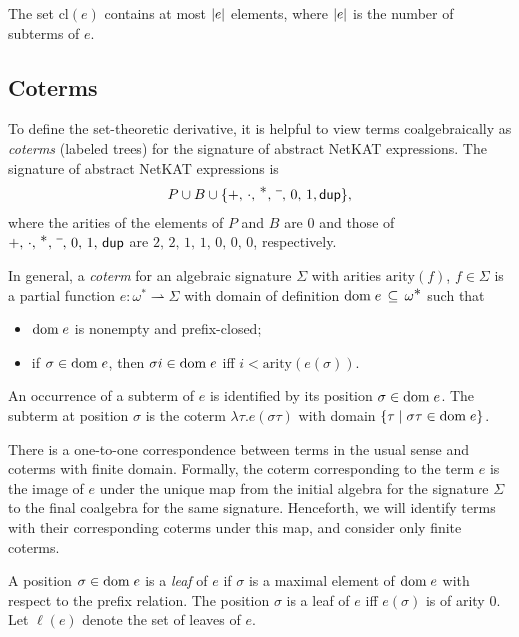 \documentclass{article}
\newcommand\pdup{\mathop{\mathsf{dup}}}
\renewcommand\star{^{\textstyle *}}
\newcommand\clname{\mathrm{cl}}
\newcommand\cl[1]{\clname(#1)}
\newcommand\pfun\rightharpoonup
\newcommand\arity[1]{\mathrm{arity}(#1)}
\begin{document}
\begin{lemma}
\label{eq:derivlinear}
The set $\cl e$ contains at most $|e|$ elements, where $|e|$ is the
number of subterms of $e$.
\end{lemma}
%
\subsection*{Coterms}

To define the set-theoretic derivative, it is helpful to view terms coalgebraically as \emph{coterms} (labeled trees) for the signature of abstract NetKAT expressions. The signature of abstract NetKAT expressions is
\begin{align*}
P\cup B\cup\{+,\,\cdot,\,\star,\,\barnone,\,0,\,1,\pdup\},
\end{align*}
where the arities of the elements of $P$ and $B$ are $0$ and those of $+,\,\cdot,\,\star,\,\barnone,\,0,\,1,\,\pdup$ are $2,\,2,\,1,\,1,\,0,\,0,\,0$, respectively.

In general, a \emph{coterm} for an algebraic signature $\Sigma$ with arities $\arity f$, $f\in\Sigma$ is a partial function $e:\omega\star\pfun\Sigma$ with domain of definition $\dom e\subs\omega\star$ such that
\begin{itemize}
\item 
${\rm dom\;}e$ is nonempty and prefix-closed;
\item
if $\sigma\in{\rm dom\;}e$, then $\sigma i\in{\rm dom\;}e$ iff $i < \arity{e(\sigma)}$.
\end{itemize}
An occurrence of a subterm of $e$ is identified by its position $\sigma\in{\rm dom\;}e$.  The subterm at position $\sigma$ is the coterm $\lambda\tau.e(\sigma\tau)$ with domain $\{\tau \mid \sigma\tau\in{\rm dom\;}e\}$.

There is a one-to-one correspondence between terms in the usual sense and coterms with finite domain. Formally, the coterm corresponding to the term $e$ is the image of $e$ under the unique map from the initial algebra for the signature $\Sigma$ to the final coalgebra for the same signature. Henceforth, we will identify terms with their corresponding coterms under this map, and consider only finite coterms.

A position $\sigma\in{\rm dom\;}e$ is a \emph{leaf} of $e$ if $\sigma$ is a maximal element of ${\rm dom\;}e$ with respect to the prefix relation. The position $\sigma$ is a leaf of $e$ iff $e(\sigma)$ is of arity 0. Let $\ell(e)$ denote the set of leaves of $e$.
\end{document}
